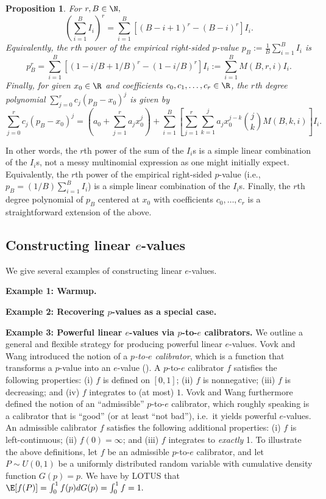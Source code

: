 \documentclass[12pt]{article}
\newtheorem{proposition}{Proposition}
\begin{document}
\begin{proposition}\label{thm:power_of_is}
For $r,B \in \N,$
$$ \left(\sum_{i=1}^B I_i\right)^r = \sum_{i=1}^B \left[ (B - i + 1)^r - (B - i)^r \right] I_i.$$ Equivalently, the $r$th power of the empirical right-sided $p$-value $p_B := \frac{1}{B} \sum_{i=1}^B  I_i $ is $$ p_B^r = \sum_{i=1}^B \left[ (1 - i/B + 1/B)^r - (1 - i/B)^r \right]I_i := \sum_{i=1}^B M(B,r,i) I_i.$$ Finally, for given $x_0 \in \R$ and coefficients $c_0, c_1, \dots, c_r \in \R$, the $r$th degree polynomial $\sum_{j=0}^r c_j(p_B - x_0)^j$ is given by
$$
\sum_{j=0}^r c_j(p_B - x_0)^j = \left( a_0 + \sum_{j=1}^r a_j x_0^j \right) + \sum_{i=1}^B \left[ \sum_{j=1}^r \sum_{k=1}^j a_j x^{j-k}_0 \binom{j}{k} M( B,k,i ) \right] I_i.
$$
\end{proposition}
In other words, the $r$th power of the sum of the $I_i$s is a simple linear combination of the $I_i$s, not a messy multinomial expression as one might initially expect. Equivalently, the $r$th power of the empirical right-sided $p$-value (i.e., $p_B = (1/B) \sum_{i=1}^B I_i$) is a simple linear combination of the $I_i$s. Finally, the $r$th degree polynomial of $p_B$ centered at $x_0$ with coefficients $c_0, \dots, c_r$ is a straightforward extension of the above.

\subsection*{Constructing linear $e$-values}

We give several examples of constructing linear $e$-values.

\textbf{Example 1: Warmup.}

\textbf{Example 2: Recovering $p$-values as a special case.}

\textbf{Example 3: Powerful linear $e$-values via $p$-to-$e$ calibrators.}  We outline a general and flexible strategy for producing powerful linear $e$-values. Vovk and Wang introduced the notion of a \textit{$p$-to-$e$ calibrator}, which is a function that transforms a $p$-value into an $e$-value (\cite{Vovk2021b}). A $p$-to-$e$ calibrator $f$ satisfies the following properties: (i) $f$ is defined on $[0,1]$; (ii) $f$ is nonnegative; (iii) $f$ is decreasing; and (iv) $f$ integrates to (at most) $1$. Vovk and Wang furthermore defined the notion of an ``admissible'' $p$-to-$e$ calibrator, which roughly speaking is a calibrator that is ``good'' (or at least ``not bad''), i.e.\ it yields powerful $e$-values.  An admissible calibrator $f$ satisfies the following additional properties: (i) $f$ is left-continuous; (ii) $f(0) = \infty$; and (iii) $f$ integrates to \textit{exactly} 1. To illustrate the above definitions, let $f$ be an admissible $p$-to-$e$ calibrator, and let $P \sim U(0,1)$ be a uniformly distributed random variable with cumulative density function $G(p) = p$. We have by LOTUS that $\E[f(P)] = \int_{0}^1 f(p) d G(p) = \int_0^1 f = 1.$ 
\end{document}
